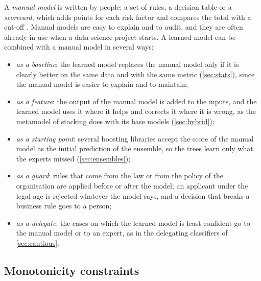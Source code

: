 A \emph{manual model} is written by people: a set of rules, a decision table or a
\emph{scorecard}, which adds points for each risk factor and compares the total with a
cut-off \citep{siddiqi2006credit}. Manual models are easy to explain and to audit, and they are
often already in use when a data science project starts. A learned model can be combined with a
manual model in several ways:
\begin{itemize}
\item \emph{as a baseline}: the learned model replaces the manual model only if it is clearly
better on the same data and with the same metric (\cref{sec:stats}), since the manual model is
easier to explain and to maintain;
\item \emph{as a feature}: the output of the manual model is added to the inputs, and the
learned model uses it where it helps and corrects it where it is wrong, as the metamodel of
stacking does with its base models (\cref{sec:hybrid});
\item \emph{as a starting point}: several boosting libraries accept the score of the manual
model as the initial prediction of the ensemble, so the trees learn only what the experts
missed (\cref{sec:ensembles});
\item \emph{as a guard}: rules that come from the law or from the policy of the organisation
are applied before or after the model; an applicant under the legal age is rejected whatever
the model says, and a decision that breaks a business rule goes to a person;
\item \emph{as a delegate}: the cases on which the learned model is least confident go to the
manual model or to an expert, as in the delegating classifiers of \cref{sec:cautious}.
\end{itemize}

\subsection{Monotonicity constraints}

